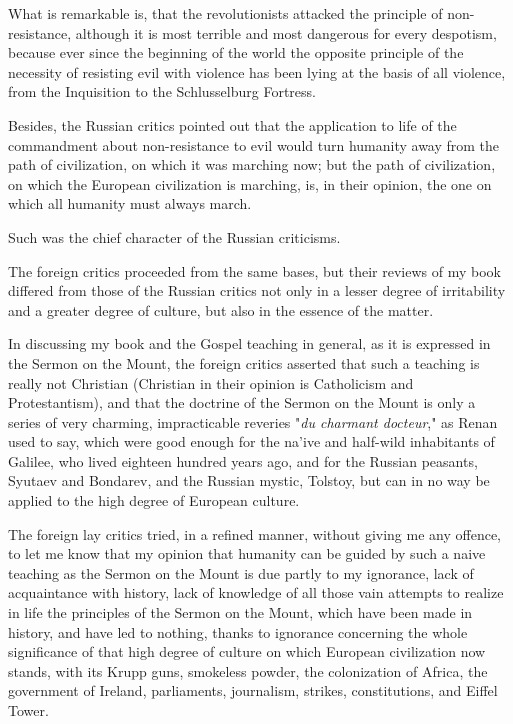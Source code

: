 \documentclass{book}
\begin{document}
What is remarkable is, that the revolutionists attacked the principle of non-resistance, although it is most terrible and most dangerous for every despotism, because ever since the beginning of the world the opposite principle of the necessity of resisting evil with violence has been lying at the basis of all violence, from the Inquisition to the Schlusselburg Fortress.

Besides, the Russian critics pointed out that the application to life of the commandment about non-resistance to evil would turn humanity away from the path of civilization, on which it was marching now; but the path of civilization, on which the European civilization is marching, is, in their opinion, the one on which all humanity must always march.

Such was the chief character of the Russian criticisms.

The foreign critics proceeded from the same bases, but their reviews of my book differed from those of the Russian critics not only in a lesser degree of irritability and a greater degree of culture, but also in the essence of the matter.

In discussing my book and the Gospel teaching in general, as it is expressed in the Sermon on the Mount, the foreign critics asserted that such a teaching is really not Christian (Christian in their opinion is Catholicism and Protestantism), and that the doctrine of the Sermon on the Mount is only a series of very charming, impracticable reveries "\emph{du charmant docteur}," as Renan used to say, which were good enough for the na’ive and half-wild inhabitants of Galilee, who lived eighteen hundred years ago, and for the Russian peasants, Syutaev and Bondarev, and the Russian mystic, Tolstoy, but can in no way be applied to the high degree of European culture.

The foreign lay critics tried, in a refined manner, without giving me any offence, to let me know that my opinion that humanity can be guided by such a naive teaching as the Sermon on the Mount is due partly to my ignorance, lack of acquaintance with history, lack of knowledge of all those vain attempts to realize in life the principles of the Sermon on the Mount, which have been made in history, and have led to nothing, thanks to ignorance concerning the whole significance of that high degree of culture on which European civilization now stands, with its Krupp guns, smokeless powder, the colonization of Africa, the government of Ireland, parliaments, journalism, strikes, constitutions, and Eiffel Tower.
\end{document}
